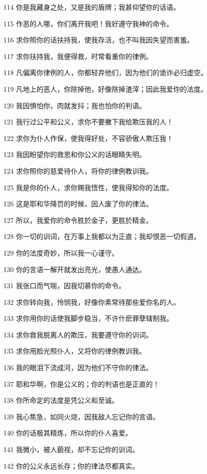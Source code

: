 \par 114 你是我藏身之处，又是我的盾牌；我甚仰望你的话语。
\par 115 作恶的人哪，你们离开我吧！我好遵守我神的命令。
\par 116 求你照你的话扶持我，使我存活，也不叫我因失望而害羞。
\par 117 求你扶持我，我便得救，时常看重你的律例。
\par 118 凡偏离你律例的人，你都轻弃他们，因为他们的诡诈必归虚空。
\par 119 凡地上的恶人，你除掉他，好像除掉渣滓；因此我爱你的法度。
\par 120 我因惧怕你，肉就发抖；我也怕你的判语。
\par 121 我行过公平和公义，求你不要撇下我给欺压我的人！
\par 122 求你为仆人作保，使我得好处，不容骄傲人欺压我！
\par 123 我因盼望你的救恩和你公义的话眼睛失明。
\par 124 求你照你的慈爱待仆人，将你的律例教训我。
\par 125 我是你的仆人，求你赐我悟性，使我得知你的法度。
\par 126 这是耶和华降罚的时候，因人废了你的律法。
\par 127 所以，我爱你的命令胜於金子，更胜於精金。
\par 128 你一切的训词，在万事上我都以为正直；我却恨恶一切假道。
\par 129 你的法度奇妙，所以我一心谨守。
\par 130 你的言语一解开就发出亮光，使愚人通达。
\par 131 我张口而气喘，因我切慕你的命令。
\par 132 求你转向我，怜悯我，好像你素常待那些爱你名的人。
\par 133 求你用你的话使我脚步稳当，不许什麽罪孽辖制我。
\par 134 求你救我脱离人的欺压，我要遵守你的训词。
\par 135 求你用脸光照仆人，又将你的律例教训我。
\par 136 我的眼泪下流成河，因为他们不守你的律法。
\par 137 耶和华啊，你是公义的；你的判语也是正直的！
\par 138 你所命定的法度是凭公义和至诚。
\par 139 我心焦急，如同火烧，因我敌人忘记你的言语。
\par 140 你的话极其精炼，所以你的仆人喜爱。
\par 141 我微小，被人藐视，却不忘记你的训词。
\par 142 你的公义永远长存；你的律法尽都真实。
